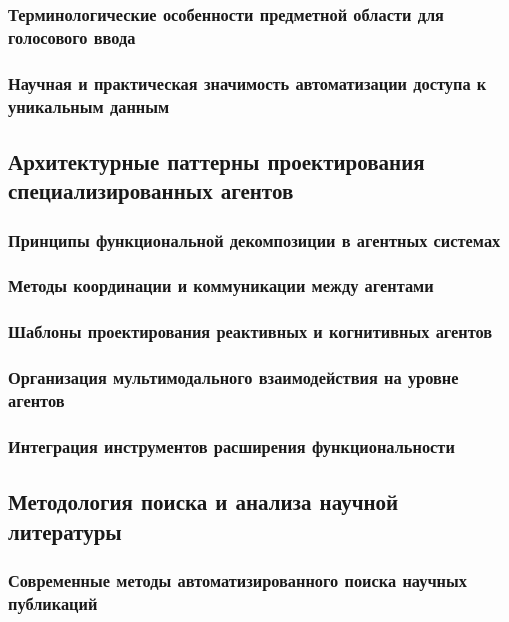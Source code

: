 \documentclass{syksu-coursework}
\begin{document}
\subsubsection{Терминологические особенности предметной области для голосового ввода}

\subsubsection{Научная и практическая значимость автоматизации доступа к уникальным данным}

\subsection{Архитектурные паттерны проектирования специализированных агентов}

\subsubsection{Принципы функциональной декомпозиции в агентных системах}

\subsubsection{Методы координации и коммуникации между агентами}

\subsubsection{Шаблоны проектирования реактивных и когнитивных агентов}

\subsubsection{Организация мультимодального взаимодействия на уровне агентов}

\subsubsection{Интеграция инструментов расширения функциональности}

\subsection{Методология поиска и анализа научной литературы}

\subsubsection{Современные методы автоматизированного поиска научных публикаций}
\end{document}
